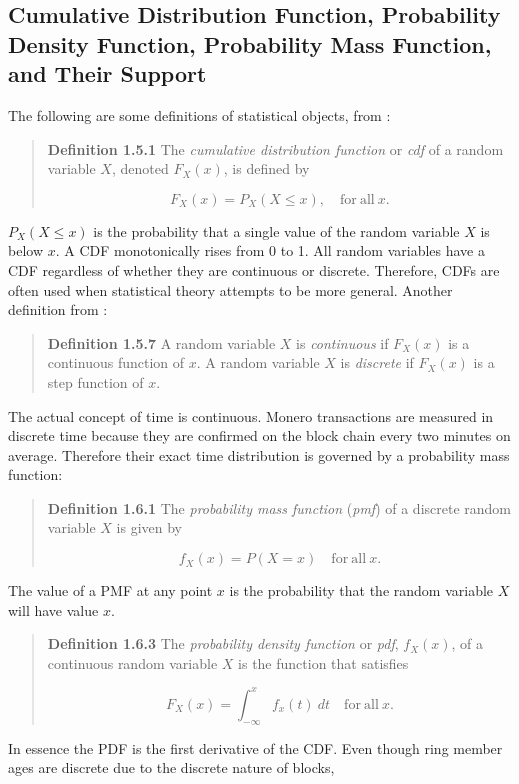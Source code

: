 \documentclass[english]{article}
\begin{document}
\subsection{Cumulative Distribution Function, Probability Density Function, Probability
Mass Function, and Their Support}

The following are some definitions of statistical objects, from \cite{CasellaBerger2002}:
\begin{quote}
\textbf{Definition 1.5.1} The \textit{cumulative distribution function}
or \textit{cdf} of a random variable $X$, denoted $F_{X}(x)$, is
defined by

\[
F_{X}(x)=P_{X}(X\leq x),\quad\mathrm{for\:all\:}x.
\]
\end{quote}
$P_{X}(X\leq x)$ is the probability that a single value of the random
variable $X$ is below $x$. A CDF monotonically rises from 0 to 1.
All random variables have a CDF regardless of whether they are continuous
or discrete. Therefore, CDFs are often used when statistical theory
attempts to be more general. Another definition from \cite{CasellaBerger2002}:
\begin{quote}
\textbf{Definition 1.5.7} A random variable $X$ is \textit{continuous}
if $F_{X}(x)$ is a continuous function of $x$. A random variable
$X$ is \textit{discrete} if $F_{X}(x)$ is a step function of $x$.
\end{quote}
The actual concept of time is continuous. Monero transactions are
measured in discrete time because they are confirmed on the block
chain every two minutes on average. Therefore their exact time distribution
is governed by a probability mass function:
\begin{quote}
\textbf{Definition 1.6.1} The \textit{probability mass function} (\textit{pmf})
of a discrete random variable $X$ is given by

\[
f_{X}(x)=P(X=x)\quad\mathrm{for\:all\:}x.
\]
\end{quote}
The value of a PMF at any point $x$ is the probability that the random
variable $X$ will have value $x$.
\begin{quote}
\textbf{Definition 1.6.3} The \textit{probability density function}
or \textit{pdf}, $f_{X}(x)$, of a continuous random variable $X$
is the function that satisfies

\[
F_{X}(x)=\int_{-\infty}^{x}f_{x}(t)\:dt\quad\mathrm{for\:all\:}x.
\]
\end{quote}
In essence the PDF is the first derivative of the CDF. Even though
ring member ages are discrete due to the discrete nature of blocks,
\end{document}
